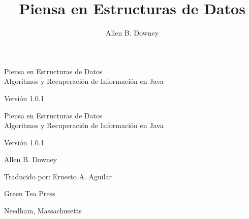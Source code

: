 \documentclass[12pt]{book}
\title{Piensa en Estructuras de Datos}
\author{Allen B. Downey}
\newcommand{\thetitle}{Piensa en Estructuras de Datos}
\newcommand{\thesubtitle}{Algoritmos y Recuperación de Información en Java}
\newcommand{\theauthors}{Allen B. Downey}
\newcommand{\theversion}{1.0.1}
\theoremstyle{exercise}
\newif\ifplastex
\begin{document}
\frontmatter

\ifplastex

\maketitle

\else

\begin{latexonly}

\thispagestyle{empty}

\begin{flushright}
\vspace*{2.0in}

\begin{spacing}{3}
{\huge \thetitle} \\
{\Large \thesubtitle}
\end{spacing}

\vspace{0.25in}

Versión \theversion

\vfill
\end{flushright}

\newpage
\thispagestyle{empty}

\quad

\newpage
\thispagestyle{empty}

\begin{flushright}
\vspace*{2.0in}

\begin{spacing}{3}
{\huge \thetitle} \\
{\Large \thesubtitle}
\end{spacing}

\vspace{0.25in}

Versión \theversion

\vspace{1in}

{\Large \theauthors}

{\small Traducido por: Ernesto A. Aguilar}

\vspace{0.5in}

{\Large Green Tea Press}

{\small Needham, Massachusetts}


\end{flushright}
\end{latexonly}
\end{document}
